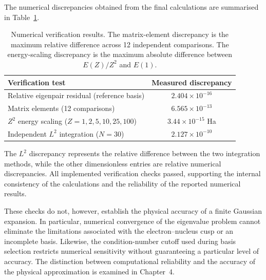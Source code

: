 The numerical discrepancies obtained from the final calculations are summarised in Table~\ref{tab:numerical_validation}.

\begin{table}[htbp]
\centering
\caption{Numerical verification results. The matrix-element discrepancy is the maximum relative difference across 12 independent comparisons. The energy-scaling discrepancy is the maximum absolute difference between $E(Z)/Z^2$ and $E(1)$.}
\label{tab:numerical_validation}
\begin{tabular}{lc}
\hline
Verification test & Measured discrepancy\\
\hline
Relative eigenpair residual (reference basis)
    & $2.404\times10^{-16}$\\
Matrix elements (12 comparisons)
    & $6.565\times10^{-13}$\\
$Z^2$ energy scaling ($Z=1,2,5,10,25,100$)
    & $3.44\times10^{-15}$ Ha\\
Independent $L^2$ integration ($N=30$)
    & $2.127\times10^{-10}$\\
\hline
\end{tabular}
\end{table}

The $L^2$ discrepancy represents the relative difference between the two integration methods, while the other dimensionless entries are relative numerical discrepancies. All implemented verification checks passed, supporting the internal consistency of the calculations and the reliability of the reported numerical results.

These checks do not, however, establish the physical accuracy of a finite Gaussian expansion. In particular, numerical convergence of the eigenvalue problem cannot eliminate the limitations associated with the electron--nucleus cusp or an incomplete basis. Likewise, the condition-number cutoff used during basis selection restricts numerical sensitivity without guaranteeing a particular level of accuracy. The distinction between computational reliability and the accuracy of the physical approximation is examined in Chapter~4.
